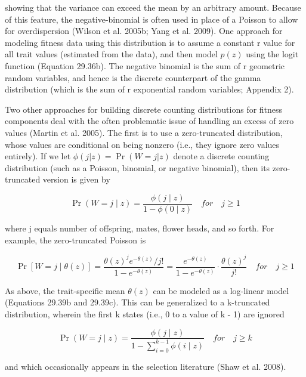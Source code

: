 \documentclass{article}
\begin{document}
showing that the variance can exceed the mean by an arbitrary amount. Because of this feature, the negative-binomial is often used in place of a Poisson to allow for overdispersion (Wilson et al. 2005b; Yang et al. 2009). One approach for modeling fitness data using this distribution is to assume a constant r value for all trait values (estimated from the data), and then model  $ p(z) $ using the logit function (Equation 29.36b). The negative binomial is the sum of r geometric random variables, and hence is the discrete counterpart of the gamma distribution (which is the sum of r exponential random variables; Appendix 2).

Two other approaches for building discrete counting distributions for fitness components deal with the often problematic issue of handling an excess of zero values (Martin et al. 2005). The first is to use a zero-truncated distribution, whose values are conditional on being nonzero (i.e., they ignore zero values entirely). If we let  $ \phi(j|z) = \operatorname{Pr}(W = j|z) $ denote a discrete counting distribution (such as a Poisson, binomial, or negative binomial), then its zero-truncated version is given by

\begin{equation}
\Pr(W=j\mid z)=\frac{\phi(j\mid z)}{1-\phi(0\mid z)}\quad for\quad j\geq1
\tag{29.41a}
\label{eq:29_41a}
\end{equation}

where j equals number of offspring, mates, flower heads, and so forth. For example, the zero-truncated Poisson is

\begin{equation}
\Pr[W=j\mid\theta(z)]=\frac{\theta(z)^{j}e^{-\theta(z)}/j!}{1-e^{-\theta(z)}}=\frac{e^{-\theta(z)}}{1-e^{-\theta(z)}}\cdot\frac{\theta(z)^{j}}{j!}\quad for\quad j\geq1
\tag{29.41b}
\label{eq:29_41b}
\end{equation}

As above, the trait-specific mean  $ \theta(z) $ can be modeled as a log-linear model (Equations 29.39b and 29.39c). This can be generalized to a k-truncated distribution, wherein the first k states (i.e., 0 to a value of k - 1) are ignored

\begin{equation}
\Pr(W=j\mid z)=\frac{\phi(j\mid z)}{1-\sum_{i=0}^{k-1}\phi(i\mid z)}\quad for\quad j\geq k
\tag{29.41c}
\label{eq:29_41c}
\end{equation}

and which occasionally appears in the selection literature (Shaw et al. 2008).
\end{document}
